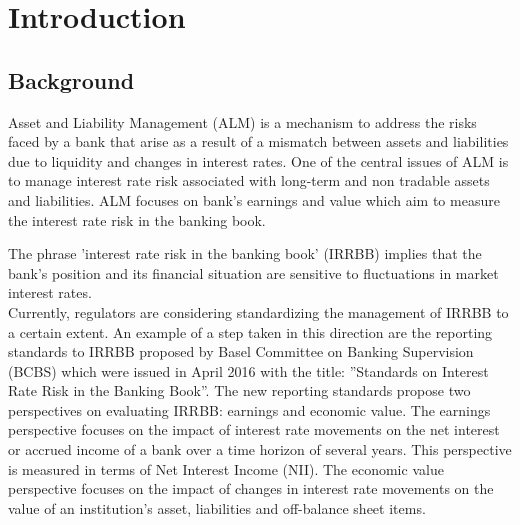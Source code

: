 \documentclass[11pt]{report}
\begin{document}
%





\chapter{Introduction}


\section{Background}

Asset and Liability Management (ALM) is a mechanism to address the risks faced by a
bank that arise as a result of a mismatch between assets and liabilities due to liquidity and changes in interest rates. One of the central issues of ALM is to manage interest rate risk associated with long-term and non tradable assets and liabilities. ALM focuses on bank’s earnings and value which aim to measure the interest rate risk in the banking book.


The phrase ’interest rate risk in the banking book’ (IRRBB) implies that the bank’s position and its financial situation are sensitive to fluctuations in market interest rates.\\


Currently, regulators are considering standardizing the management of IRRBB to a certain extent. An example of a step taken in this direction are the reporting standards
to IRRBB proposed by Basel Committee on Banking Supervision (BCBS) which were
issued in April 2016 with the title: ”Standards on Interest Rate Risk in the Banking
Book”. The new reporting standards propose two perspectives on evaluating IRRBB:
earnings and economic value. The earnings perspective focuses on the impact of interest rate movements on the net interest or accrued income of a bank over a time
horizon of several years. This perspective is measured in terms of Net Interest Income
(NII). The economic value perspective focuses on the impact of changes in interest rate
movements on the value of an institution’s asset, liabilities and off-balance sheet items.\\
\end{document}
